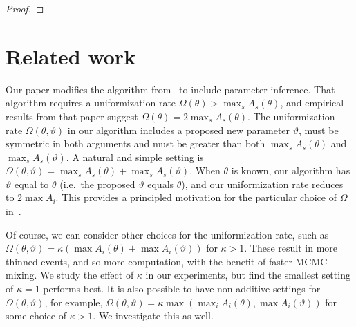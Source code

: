 \begin{proof}
\end{proof}

\section{Related work}\label{sec:comments}

Our paper modifies the algorithm from~\citet{RaoTeh13} to include parameter inference.
That algorithm requires a uniformization rate $\Omega(\theta) > \max_s A_s(\theta)$, and empirical results from that paper suggest $\Omega(\theta) = 2\max_s A_s(\theta)$.
The uniformization rate $\Omega(\theta,\vartheta)$ in our algorithm includes a proposed new parameter $\vartheta$, must be symmetric in both arguments and must be greater than both $\max_s A_s(\theta)$ and $\max_s A_s(\vartheta)$. 
A natural and simple setting is $\Omega(\theta,\vartheta) = \max_s A_s(\theta) + \max_s A_s(\vartheta)$. 
When $\theta$ is known, our algorithm has $\vartheta$ equal to $\theta$ (i.e.\ the proposed $\vartheta$ equals $\theta$), and our uniformization rate reduces to $2\max A_i$. 
This provides a principled motivation for the particular choice of $\Omega$ in~\citet{RaoTeh13}.

Of course, we can consider other choices for the uniformization rate, such as $\Omega(\theta,\vartheta) = \kappa(\max A_i(\theta) + \max A_i(\vartheta))$ for $\kappa > 1$.  These result in more thinned events, and so more computation, with the benefit of faster MCMC mixing. We study the effect of 
$\kappa$ in our experiments, but find the smallest setting of $\kappa=1$ performs best.
It is also possible to have non-additive settings for $\Omega(\theta,\vartheta)$, for example, $\Omega(\theta,\vartheta) = \kappa \max( \max_i A_i(\theta), \max A_i(\vartheta))$ for some choice of $\kappa > 1$. We investigate this as well.


